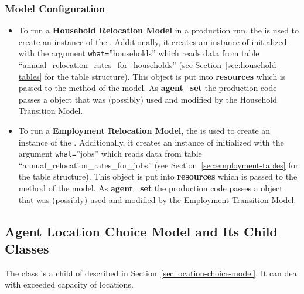 %
\subsubsection{Model Configuration}
\modelsindex
%
\begin{itemize}
\item To run a {\bf Household Relocation Model} \modelsindex in a production run, the
   \modelsindex is used to create an instance of the
  . \modelsindex Additionally, it creates an instance of
   initialized with the argument \verb|what=|''households''
  which reads data from table ``annual_relocation_rates_for_households'' (see
  Section~\ref{sec:household-tables} for the table structure). This object is
  put into {\bf resources} which is passed to the  method of
  the model. \modelsindex As {\bf agent_set} the production code passes a
   object that was (possibly) used and modified by the
  Household Transition Model. \modelsindex
\item To run a {\bf Employment Relocation Model}, \modelsindex the
   \modelsindex is used to create an instance of the
  . \modelsindex Additionally, it creates an instance of
   initialized with the argument \verb|what=|''jobs''
  which reads data from table ``annual_relocation_rates_for_jobs'' (see
  Section~\ref{sec:employment-tables} for the table structure). This object is
  put into {\bf resources} which is passed to the  method of
  the model. \modelsindex As {\bf agent_set} the production code passes a
   object that was (possibly) used and modified by the
  Employment Transition Model. \modelsindex
\end{itemize}

%
\subsection{Agent Location Choice Model and Its Child Classes}
\modelsindex
%
\label{sec:agent-lcm}

The class  \modelsindex is a child
of  \modelsindex described in
Section~\ref{sec:location-choice-model}. It can deal with exceeded capacity of locations.

